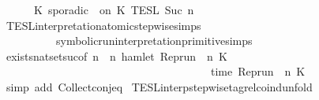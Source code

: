 \begin{isabellebody}
{}\isanewline
\ \ \ \ {\isasymunion}\ {\isasymlbrakk}\ K\ sporadic\ {\isasymtau}\ on\ K\ {\isasymrbrakk}\isactrlsub T\isactrlsub E\isactrlsub S\isactrlsub L\isactrlbsup {\isasymge}\ Suc\ n\isactrlesup {\isacartoucheclose}\ \ \ %
\isanewline
%
\isadelimproof
%
\endisadelimproof
%
\isatagproof
{}\isamarkupfalse%
\ TESL{\isacharunderscore}interpretation{\isacharunderscore}atomic{\isacharunderscore}stepwise{\isachardot}simps{\isacharparenleft}{}{\isacharparenright}\isanewline
\ \ \ \ \ \ \ \ \ \ symbolic{\isacharunderscore}run{\isacharunderscore}interpretation{\isacharunderscore}primitive{\isachardot}simps{\isacharparenleft}{}{\isacharcomma}{}{\isacharparenright}\isanewline
{}\isamarkupfalse%
\ exists{\isacharunderscore}nat{\isacharunderscore}set{\isacharunderscore}suc{\isacharbrackleft}of\ {\isacartoucheopen}n{\isacartoucheclose}\ {\isacartoucheopen}{\isasymlambda}{\isasymrho}\ n{\isachardot}\ hamlet\ {\isacharparenleft}Rep{\isacharunderscore}run\ {\isasymrho}\ n\ K\isanewline
\ \ \ \ \ \ \ \ \ \ \ \ \ \ \ \ \ \ \ \ \ \ \ \ \ \ \ \ \ \ \ \ \ \ \ \ \ {\isasymand}\ time\ {\isacharparenleft}Rep{\isacharunderscore}run\ {\isasymrho}\ n\ K\ {\isacharequal}\ {\isasymtau}{\isacartoucheclose}{\isacharbrackright}\isanewline
{}\isamarkupfalse%
\ {\isacharparenleft}simp\ add{\isacharcolon}\ Collect{\isacharunderscore}conj{\isacharunderscore}eq{\isacharparenright}%
\endisatagproof
{\isafoldproof}%
%
\isadelimproof
\isanewline
%
\endisadelimproof
\isanewline
\isanewline
{}\isamarkupfalse%
\ TESL{\isacharunderscore}interp{\isacharunderscore}stepwise{\isacharunderscore}tagrel{\isacharunderscore}coind{\isacharunderscore}unfold{\isacharcolon}\isanewline

\end{isabellebody}
